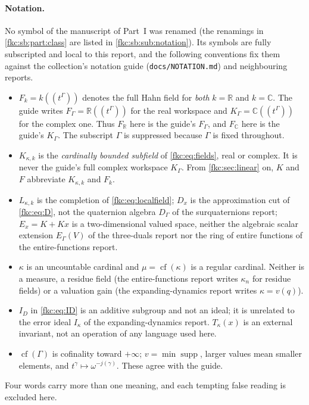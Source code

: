 \documentclass[11pt,letterpaper]{article}
\numberwithin{equation}{section}
\theoremstyle{definition}
\theoremstyle{remark}
\newcommand{\R}{\mathbb R}
\newcommand{\C}{\mathbb C}
\newcommand{\supp}{\operatorname{supp}}
\newcommand{\cf}{\operatorname{cf}}
\begin{document}
\paragraph{Notation.}
No symbol of the manuscript of Part~I was renamed (the renamings in \cref{fkc:sb:part:class} are listed in \cref{fkc:sb:sub:notation}). Its symbols are fully subscripted and local to this report, and the following conventions fix them against the collection's notation guide (\texttt{docs/NOTATION.md}) and neighbouring reports.
\begin{itemize}
\item $F_k=k((t^\Gamma))$ denotes the full Hahn field for \emph{both} $k=\R$ and $k=\C$. The guide writes $F_\Gamma=\R((t^\Gamma))$ for the real workspace and $K_\Gamma=\C((t^\Gamma))$ for the complex one. Thus $F_\R$ here is the guide's $F_\Gamma$, and $F_\C$ here is the guide's $K_\Gamma$. The subscript $\Gamma$ is suppressed because $\Gamma$ is fixed throughout.
\item $K_{\kappa,k}$ is the \emph{cardinally bounded subfield} of \eqref{fkc:eq:fields}, real or complex. It is never the guide's full complex workspace $K_\Gamma$. From \cref{fkc:sec:linear} on, $K$ and $F$ abbreviate $K_{\kappa,k}$ and $F_k$.
\item $L_{\kappa,k}$ is the completion of \eqref{fkc:eq:localfield}; $D_x$ is the approximation cut of \eqref{fkc:eq:D}, not the quaternion algebra $D_\Gamma$ of the surquaternions report; $E_x=K+Kx$ is a two-dimensional valued space, neither the algebraic scalar extension $E_\Gamma(V)$ of the three-duals report nor the ring of entire functions of the entire-functions report.
\item $\kappa$ is an uncountable cardinal and $\mu=\cf(\kappa)$ is a regular cardinal. Neither is a measure, a residue field (the entire-functions report writes $\kappa_n$ for residue fields) or a valuation gain (the expanding-dynamics report writes $\kappa=v(q)$).
\item $I_D$ in \eqref{fkc:eq:ID} is an additive subgroup and not an ideal; it is unrelated to the error ideal $I_\kappa$ of the expanding-dynamics report. $T_\kappa(x)$ is an external invariant, not an operation of any language used here.
\item $\cf(\Gamma)$ is cofinality toward $+\infty$; $v=\min\supp$, larger values mean smaller elements, and $t^\gamma\mapsto\omega^{-j(\gamma)}$. These agree with the guide.
\end{itemize}
Four words carry more than one meaning, and each tempting false reading is excluded here.
\end{document}
